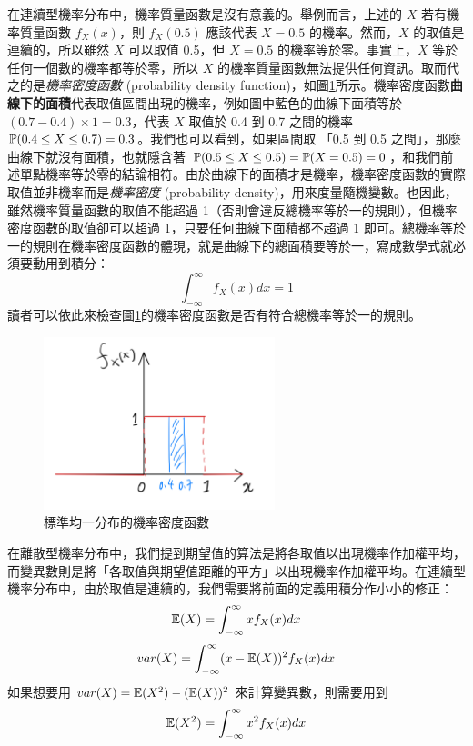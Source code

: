     在連續型機率分布中，機率質量函數是沒有意義的。舉例而言，上述的 $X$ 若有機率質量函數 $f_X(x)$，則 $f_X(0.5)$ 應該代表 $X = 0.5$ 的機率。然而，$X$ 的取值是連續的，所以雖然 $X$ 可以取值 0.5，但 $X = 0.5$ 的機率等於零。事實上，$X$ 等於任何一個數的機率都等於零，所以 $X$ 的機率質量函數無法提供任何資訊。取而代之的是\textit{機率密度函數} (probability density function)，如圖\ref{fig:uniform}所示。機率密度函數\textbf{曲線下的面積}代表取值區間出現的機率，例如圖中藍色的曲線下面積等於 $(0.7-0.4) \times 1 = 0.3$，代表 $X$ 取值於 0.4 到 0.7 之間的機率 $\mathbb{P}(0.4 \le X \le 0.7) = 0.3$。我們也可以看到，如果區間取 「0.5 到 0.5 之間」，那麼曲線下就沒有面積，也就隱含著 $\mathbb{P}(0.5 \le X \le 0.5) = \mathbb{P}(X=0.5) = 0$，和我們前述單點機率等於零的結論相符。由於曲線下的面積才是機率，機率密度函數的實際取值並非機率而是\textit{機率密度} (probability density)，用來度量隨機變數。也因此，雖然機率質量函數的取值不能超過 1（否則會違反總機率等於一的規則），但機率密度函數的取值卻可以超過 1，只要任何曲線下面積都不超過 1 即可。總機率等於一的規則在機率密度函數的體現，就是曲線下的總面積要等於一，寫成數學式就必須要動用到積分：
    \[\int_{-\infty}^{\infty} f_X(x) dx = 1\]
    讀者可以依此來檢查圖\ref{fig:uniform}的機率密度函數是否有符合總機率等於一的規則。
    \begin{figure}[htbp]
        \centering
        \includegraphics[width=0.6\textwidth]{figures/03-Probability_distribution/Uniform.jpeg}
        \caption{標準均一分布的機率密度函數}
        \label{fig:uniform}
    \end{figure}

    在離散型機率分布中，我們提到期望值的算法是將各取值以出現機率作加權平均，而變異數則是將「各取值與期望值距離的平方」以出現機率作加權平均。在連續型機率分布中，由於取值是連續的，我們需要將前面的定義用積分作小小的修正：
    \[\mathbb{E}(X) = \int_{-\infty}^{\infty} x f_X(x) dx\]
    \[var(X) = \int_{-\infty}^{\infty} (x-\mathbb{E}(X))^2 f_X(x) dx\]
    如果想要用 $var(X) = \mathbb{E}(X^2) - (\mathbb{E}(X))^2$ 來計算變異數，則需要用到
    \[\mathbb{E}(X^2) = \int_{-\infty}^{\infty} x^2 f_X(x) dx\]

